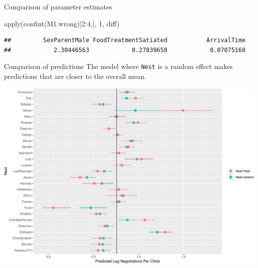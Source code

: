 \documentclass[
  ignorenonframetext,
]{beamer}
\newenvironment{Shaded}{\begin{snugshade}}{\end{snugshade}}
\newcommand{\DecValTok}[1]{\textcolor[rgb]{0.00,0.00,0.81}{#1}}
\newcommand{\FunctionTok}[1]{\textcolor[rgb]{0.00,0.00,0.00}{#1}}
\newcommand{\NormalTok}[1]{#1}
\newcommand{\SpecialCharTok}[1]{\textcolor[rgb]{0.00,0.00,0.00}{#1}}
\begin{document}
\begin{frame}[fragile]{Comparison of parameter estimates}
\begin{Shaded}
\begin{Highlighting}[]
\FunctionTok{apply}\NormalTok{(}\FunctionTok{confint}\NormalTok{(M1.wrong)[}\DecValTok{2}\SpecialCharTok{:}\DecValTok{4}\NormalTok{,], }\DecValTok{1}\NormalTok{, diff)}
\end{Highlighting}
\end{Shaded}

\begin{verbatim}
##         SexParentMale FoodTreatmentSatiated           ArrivalTime 
##            2.30446563            0.27839658            0.07075168
\end{verbatim}
\end{frame}

\begin{frame}[fragile]{Comparison of predictions}
\protect\hypertarget{comparison-of-predictions}{}
The model where \texttt{Nest} is a random effect makes predictions that
are closer to the overall mean.

\includegraphics{mixed_models_files/figure-beamer/unnamed-chunk-22-1.pdf}
\end{frame}
\end{document}
